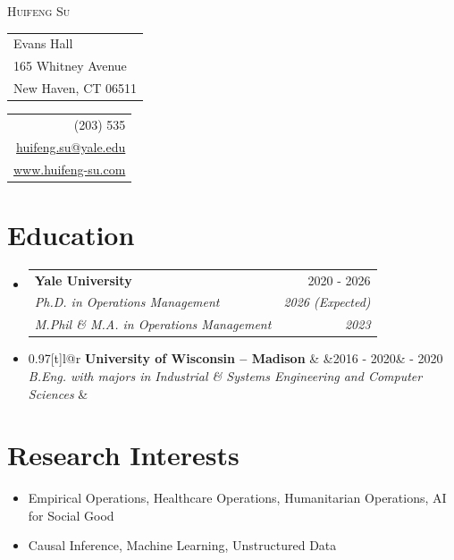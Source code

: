 \documentclass[letterpaper,11pt]{article}
\makeatletter
\newcommand{\resumeSubheadingYale}[6]{
  \vspace{-2pt}\item
    \begin{tabular*}{0.97\textwidth}[t]{l@{\extracolsep{\fill}}r}
      \textbf{#1} & #2 \\
      \textit{\small#3} & \textit{\small #4} \\
      \textit{\small#5} & \textit{\small #6} \\
    \end{tabular*}\vspace{-7pt}
}
\newcommand{\resumeSubheadingWisc}[4]{
  \vspace{-2pt}\item
    \begin{tabular*}{0.97\textwidth}[t]{l@{\extracolsep{\fill}}r}
      \textbf{#1} & \ifx&#2&\else#2\fi \\
      \textit{\small#3} & \textit{\small #4} \\
    \end{tabular*}\vspace{-7pt}
}
\newcommand{\resumeSubHeadingListStart}{\begin{itemize}[leftmargin=0.15in, label={}]}
\newcommand{\resumeSubHeadingListEnd}{\end{itemize}}
\makeatother
\begin{document}

\thispagestyle{plain}

\begin{center}
  \vspace{-10pt} %
  {\Huge \scshape Huifeng Su\par}
  \vspace{2pt}
\end{center}
\vspace{-6pt}

\noindent
\begin{minipage}[t]{0.56\textwidth}
  \flushleft\small
  \begin{tabular}{@{}l@{}}
    Evans Hall\\
    
    165 Whitney Avenue\\
    New Haven, CT 06511
  \end{tabular}
\end{minipage}
\hfill
\begin{minipage}[t]{0.40\textwidth}
  \flushright\small
  \begin{tabular}{@{}r@{}}
    (203) 535\textendash8177\\
    \href{mailto:huifeng.su@yale.edu}{huifeng.su@yale.edu}\\
    \href{https://www.huifeng-su.com}{www.huifeng-su.com}
  \end{tabular}
\end{minipage}
\vspace{6pt}


\section{Education}
  \resumeSubHeadingListStart
    \resumeSubheadingYale
      {Yale University}{2020 - 2026}
      {Ph.D. in Operations Management}{2026 (Expected)}
      {M.Phil \& M.A.  in Operations Management}{2023}
    \resumeSubheadingWisc
      {University of Wisconsin – 
 Madison}{2016 - 2020}
      {B.Eng. with majors in Industrial \& Systems Engineering and Computer Sciences}{}
      
\resumeSubHeadingListEnd

\section{Research Interests}
\begin{itemize}[leftmargin=*, topsep=0pt plus 1pt]
    \item Empirical Operations, Healthcare Operations, Humanitarian Operations, AI for Social Good
    \vspace{-8pt}
    \item Causal Inference, Machine Learning, Unstructured Data
\end{itemize}
\end{document}
